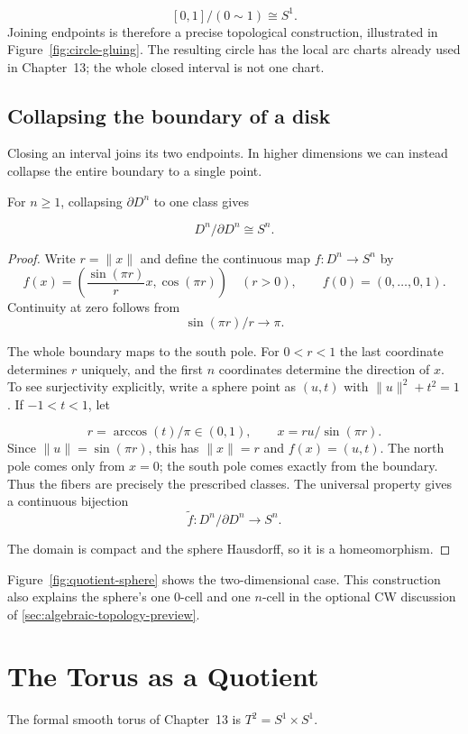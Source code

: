 \[
[0,1]/(0\sim1)\cong S^1.
\]
 Joining endpoints is therefore a precise
topological construction, illustrated in Figure~\ref{fig:circle-gluing}.
The resulting circle has the local arc charts already used in Chapter~13;
the whole closed interval is not one chart.

\FloatBarrier

\subsection*{Collapsing the boundary of a disk}\label{sec:quotient-sphere}
Closing an interval joins its two endpoints. In higher dimensions we can
instead collapse the entire boundary to a single point.
\begin{proposition}
For $n\geq1$, collapsing $\partial D^n$ to one class gives

\[
D^n/\partial D^n\cong S^n.
\]

\end{proposition}
\begin{proof}
Write $r=\|x\|$ and define the continuous map $f:D^n\to S^n$ by
\[
f(x)=\left(\frac{\sin(\pi r)}{r}x,\cos(\pi r)\right)\quad(r>0),
\qquad f(0)=(0,\ldots,0,1).
\]
Continuity at zero follows from
\[
\sin(\pi r)/r\to\pi.
\]

The whole boundary maps to the south pole. For $0<r<1$ the last
coordinate determines $r$ uniquely, and the first $n$ coordinates
determine the direction of $x$. To see surjectivity explicitly, write a
sphere point as $(u,t)$ with $\|u\|^2+t^2=1$. If $-1<t<1$, let

\[
r=\arccos(t)/\pi\in(0,1),\qquad x=ru/\sin(\pi r).
\]
 Since
$\|u\|=\sin(\pi r)$, this has $\|x\|=r$ and $f(x)=(u,t)$.
The north pole comes only from $x=0$; the south pole comes exactly from
the boundary. Thus the fibers are precisely the prescribed classes. The universal property gives
a continuous bijection
\[
\widetilde f:D^n/\partial D^n\to S^n.
\]

The domain is compact and the sphere Hausdorff, so it is a homeomorphism.
\end{proof}
Figure~\ref{fig:quotient-sphere} shows the two-dimensional case. This
construction also explains the sphere's one $0$-cell and one $n$-cell
in the optional CW discussion of \cref{sec:algebraic-topology-preview}.

\FloatBarrier

\section{The Torus as a Quotient}\label{sec:quotient-torus}
The formal smooth torus of Chapter~13 is $T^2=S^1\times S^1$.
